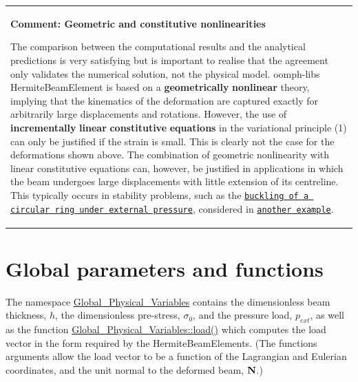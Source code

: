 \tabulinesep=1mm
\begin{longtabu} spread 0pt [c]{*{1}{|X[-1]}|}
\hline
\begin{center}{\bfseries Comment\+: Geometric and constitutive nonlinearities}\end{center}  The comparison between the computational results and the analytical predictions is very satisfying but is important to realise that the agreement only validates the numerical solution, not the physical model. {\ttfamily oomph-\/lib\textquotesingle{}s} {\ttfamily Hermite\+Beam\+Element} is based on a {\bfseries geometrically} {\bfseries nonlinear} theory, implying that the kinematics of the deformation are captured exactly for arbitrarily large displacements and rotations. However, the use of {\bfseries incrementally} {\bfseries linear} {\bfseries constitutive} {\bfseries equations} in the variational principle (1) can only be justified if the strain is small. This is clearly not the case for the deformations shown above. The combination of geometric nonlinearity with linear constitutive equations can, however, be justified in applications in which the beam undergoes large displacements with little extension of its centreline. This typically occurs in stability problems, such as the \href{../../steady_ring/html/index.html}{\tt buckling of a circular ring under external pressure}, considered in \href{../../steady_ring/html/index.html}{\tt another example}.

\\
\end{longtabu}




 

\hypertarget{index_global}{}\section{Global parameters and functions}\label{index_global}
The namespace {\ttfamily \hyperlink{namespaceGlobal__Physical__Variables}{Global\+\_\+\+Physical\+\_\+\+Variables}} contains the dimensionless beam thickness, $ h $, the dimensionless pre-\/stress, $ \sigma_{0} $, and the pressure load, $ p_{ext} $, as well as the function {\ttfamily \hyperlink{namespaceGlobal__Physical__Variables_a321267e1efb30b5d586302509354fb07}{Global\+\_\+\+Physical\+\_\+\+Variables\+::load()}} which computes the load vector in the form required by the {\ttfamily Hermite\+Beam\+Elements}. (The function\textquotesingle{}s arguments allow the load vector to be a function of the Lagrangian and Eulerian coordinates, and the unit normal to the deformed beam, $ {\bf N} $.)

